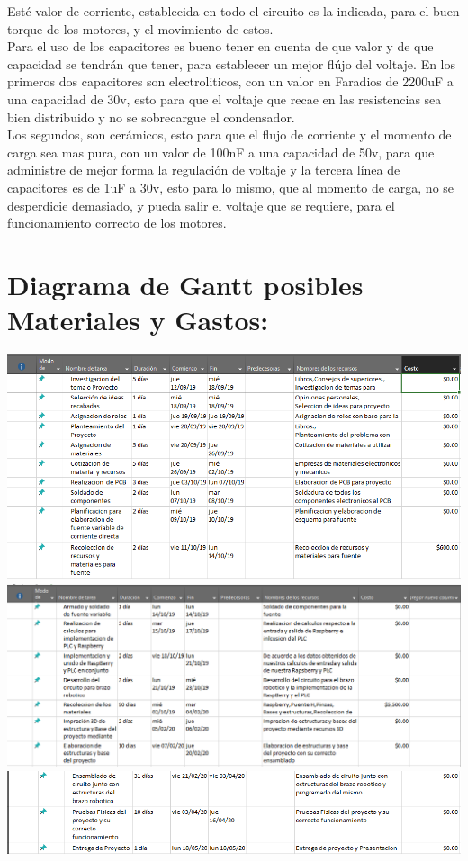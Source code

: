 \documentclass[14pt,a4paper]{article}
\begin{document}
Esté valor de corriente, establecida en todo el circuito es la indicada, para el buen torque de los motores, y el movimiento de estos.\\
Para el uso de los capacitores es bueno tener en cuenta de que valor y de que capacidad se tendrán que tener, para establecer un mejor flújo del voltaje. En los primeros dos capacitores son electroliticos, con un valor en Faradios de 2200uF a una capacidad de 30v, esto para que el voltaje que recae en las resistencias sea bien distribuido y no se sobrecargue el condensador.\\
Los segundos, son cerámicos, esto para que el flujo de corriente y el momento de carga sea mas pura, con un valor de 100nF a una capacidad de 50v, para que administre de mejor forma la regulación de voltaje y la tercera línea de capacitores es de 1uF a 30v, esto para lo mismo, que al momento de carga, no se desperdicie demasiado, y pueda salir el voltaje que se requiere, para el funcionamiento correcto de los motores.

\section{Diagrama de Gantt posibles Materiales y Gastos:}

\begin{center}
\includegraphics[width=15cm]{DefinicionTareas/4.png} 
\includegraphics[width=15cm]{DefinicionTareas/5.png} 
\includegraphics[width=15cm]{DefinicionTareas/6.png} 
\end{center}
\end{document}
